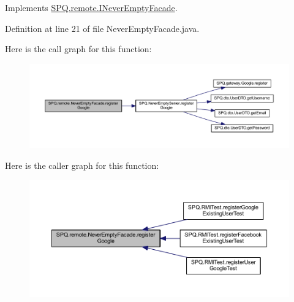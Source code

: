 Implements \mbox{\hyperlink{interface_s_p_q_1_1remote_1_1_i_never_empty_facade_a93f3250c09a26fdb1d65219599dfd542}{S\+P\+Q.\+remote.\+I\+Never\+Empty\+Facade}}.



Definition at line 21 of file Never\+Empty\+Facade.\+java.

Here is the call graph for this function\+:
\nopagebreak
\begin{figure}[H]
\begin{center}
\leavevmode
\includegraphics[width=350pt]{class_s_p_q_1_1remote_1_1_never_empty_facade_aaa8d4a6148957029af068d00da24890b_cgraph}
\end{center}
\end{figure}
Here is the caller graph for this function\+:
\nopagebreak
\begin{figure}[H]
\begin{center}
\leavevmode
\includegraphics[width=350pt]{class_s_p_q_1_1remote_1_1_never_empty_facade_aaa8d4a6148957029af068d00da24890b_icgraph}
\end{center}
\end{figure}
\mbox{\label{class_s_p_q_1_1remote_1_1_never_empty_facade_a52a0feff1dfb3347e55e46c3ac48fafc}} 
